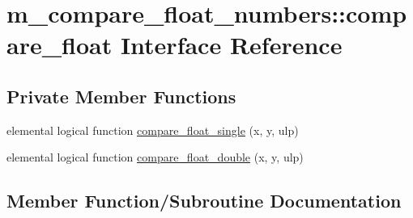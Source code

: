 \hypertarget{interfacem__compare__float__numbers_1_1compare__float}{}\section{m\+\_\+compare\+\_\+float\+\_\+numbers\+:\+:compare\+\_\+float Interface Reference}
\label{interfacem__compare__float__numbers_1_1compare__float}
\subsection*{Private Member Functions}
\begin{DoxyCompactItemize}
\item 
elemental logical function \hyperlink{interfacem__compare__float__numbers_1_1compare__float_a756f4b26fbc31b581df644519f3a9e1f}{compare\+\_\+float\+\_\+single} (x, y, ulp)
\item 
elemental logical function \hyperlink{interfacem__compare__float__numbers_1_1compare__float_a9129de95bc70a1d2db0421b329ca2f45}{compare\+\_\+float\+\_\+double} (x, y, ulp)
\end{DoxyCompactItemize}


\subsection{Member Function/\+Subroutine Documentation}
\mbox{\label{interfacem__compare__float__numbers_1_1compare__float_a9129de95bc70a1d2db0421b329ca2f45}} 
